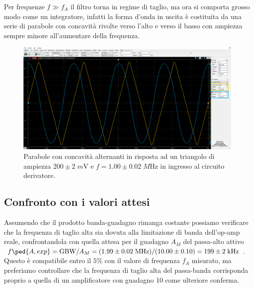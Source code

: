 \documentclass[10pt,a4paper]{article}
\begin{document}
Per frequenze $f \gg f_A$ il filtro torna in regime di taglio, ma ora si
comporta grosso modo come un integratore, infatti la forma d'onda in uscita è
costituita da una serie di parabole con concavità rivolte verso l'alto e verso
il basso con ampiezza sempre minore all'aumentare della frequenza.
\begin{figure}[htbp]
\centering
\includegraphics[scale=0.335]{derpar}
\caption{Parabole con concavità alternanti in risposta ad un triangolo di
ampiezza $200 \pm 2 \; \si{m\V}$ e $f = 1.00 \pm 0.02 \; \si{M\Hz}$ in ingresso
al circuito derivatore. \label{fig: derpar}}
\end{figure}

\subsection{Confronto con i valori attesi}
Assumendo che il prodotto banda-guadagno rimanga costante possiamo verificare
che la frequenza di taglio alta sia dovuta alla limitazione di banda
dell'op-amp reale, confrontandola con quella attesa per il guadagno $A_M$ del
passa-alto attivo
$f\ped{A, exp} = \mathrm{GBW}/A_M
= (1.99 \pm 0.02 \; \si{M\Hz})/(10.00 \pm 0.10) = 199 \pm 2 \; \si{k\Hz}$.
Questo è compatibile entro il $5\%$ con il valore di frequenza $f_A$ misurato,
ma preferiamo controllare che la frequenza di taglio alta del passa-banda
corrisponda proprio a quella di un amplificatore con guadagno 10 come ulteriore
conferma.
\end{document}
